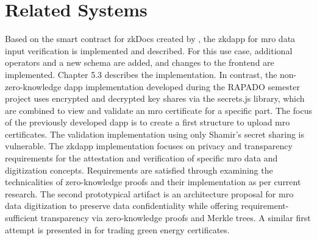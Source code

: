 \section{Related Systems}
Based on the smart contract for zkDocs created by \citet{zkdocs}, the \acrshort{zkdapp} for \acrshort{mro} data input verification is implemented and described. For this use case, additional operators and a new schema are added, and changes to the frontend are implemented. Chapter 5.3 describes the implementation. In contrast, the non-zero-knowledge \acrshort{dapp} implementation developed during the RAPADO semester project uses encrypted and decrypted key shares via the secrets.js library, which are combined to view and validate an \acrshort{mro} certificate for a specific part. The focus of the previously developed \acrshort{dapp} is to create a first structure to upload \acrshort{mro} certificates. The validation implementation using only Shamir's secret sharing is vulnerable. The \acrshort{zkdapp} implementation focuses on privacy and transparency requirements for the attestation and verification of specific \acrshort{mro} data and digitization concepts. Requirements are satisfied through examining the technicalities of zero-knowledge proofs and their implementation as per current research. The second prototypical artifact is an architecture proposal for \acrshort{mro} data digitization to preserve data confidentiality while offering requirement-sufficient transparency via zero-knowledge proofs and Merkle trees. A similar first attempt is presented in \citet{sedlemeirgrenenergy} for trading green energy certificates. 
